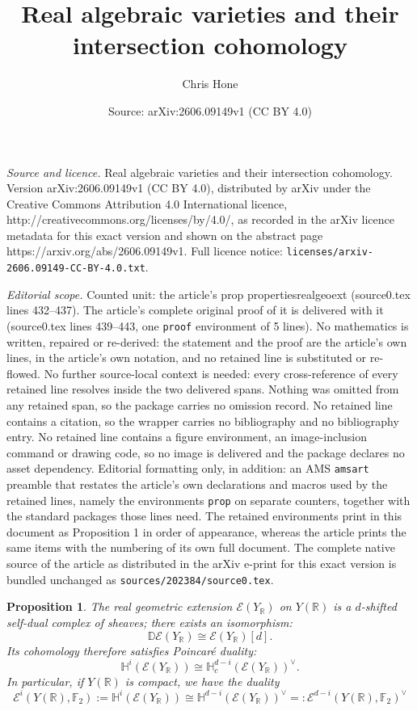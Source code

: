 \documentclass[10pt,a4paper]{amsart}
\title{Real algebraic varieties and their intersection cohomology}
\author{Chris Hone}
\date{Source: arXiv:2606.09149v1 (CC BY 4.0)}
\newtheorem{prop}{Proposition}
\begin{document}
\maketitle

\noindent\emph{Source and licence.} Real algebraic varieties and their intersection cohomology. Version arXiv:2606.09149v1 (CC BY 4.0), distributed by arXiv under the Creative Commons Attribution 4.0 International licence, http://creativecommons.org/licenses/by/4.0/, as recorded in the arXiv licence metadata for this exact version and shown on the abstract page https://arxiv.org/abs/2606.09149v1. Full licence notice: \texttt{licenses/arxiv-2606.09149-CC-BY-4.0.txt}.\par\smallskip

\noindent\textit{Editorial scope.} Counted unit: the article's prop propertiesrealgeoext (source0.tex lines 432--437). The article's complete original proof of it is delivered with it (source0.tex lines 439--443, one \texttt{proof} environment of 5 lines). No mathematics is written, repaired or re-derived: the statement and the proof are the article's own lines, in the article's own notation, and no retained line is substituted or re-flowed.  No further source-local context is needed: every cross-reference of every retained line resolves inside the two delivered spans.  Nothing was omitted from any retained span, so the package carries no omission record.  No retained line contains a citation, so the wrapper carries no bibliography and no bibliography entry.  No retained line contains a figure environment, an image-inclusion command or drawing code, so no image is delivered and the package declares no asset dependency.  Editorial formatting only, in addition: an AMS \texttt{amsart} preamble that restates the article's own declarations and macros used by the retained lines, namely the environments \texttt{prop} on separate counters, together with the standard packages those lines need.  The retained environments print in this document as Proposition 1 in order of appearance, whereas the article prints the same items with the numbering of its own full document.  The complete native source of the article as distributed in the arXiv e-print for this exact version is bundled unchanged as \texttt{sources/202384/source0.tex}.
\begin{prop}\label{propertiesrealgeoext}
The real geometric extension $\mathscr{E}(Y_\mathbb{R})$ on $Y(\mathbb{R})$ is a $d$-shifted self-dual complex of sheaves; there exists an isomorphism: \[\mathbb{D}\mathscr{E}(Y_\mathbb{R})\cong \mathscr{E}(Y_\mathbb{R})[d].\]
Its cohomology therefore satisfies Poincaré duality:    
\[\mathbb{H}^i(\mathscr{E}(Y_\mathbb{R}))\cong \mathbb{H}^{d-i}_c(\mathscr{E}(Y_\mathbb{R}))^\vee.\]
In particular, if $Y(\mathbb{R})$ is compact, we have the duality \[\mathscr{E}^i(Y(\mathbb{R}),\mathbb{F}_2):=\mathbb{H}^i(\mathscr{E}(Y_\mathbb{R}))\cong \mathbb{H}^{d-i}(\mathscr{E}(Y_\mathbb{R}))^\vee=:\mathscr{E}^{d-i}(Y(\mathbb{R}),\mathbb{F}_2)^\vee\]
\end{prop}
\end{document}
